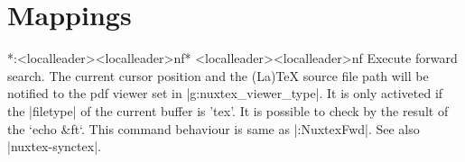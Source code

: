 \section{Mappings}

\begin{verbatim*}
						*:<localleader><localleader>nf*
<localleader><localleader>nf	Execute forward search. The current cursor position
                                and the (La)TeX source file path will be notified to
                                the pdf viewer set in |g:nuxtex_viewer_type|.
                                It is only activeted if the |filetype| of the current
                                buffer is 'tex'. It is possible to check by the result
                                of the `echo &ft`.
                                This command behaviour is same as
                                |:NuxtexFwd|.
                                See also |nuxtex-synctex|.
\end{verbatim*}

